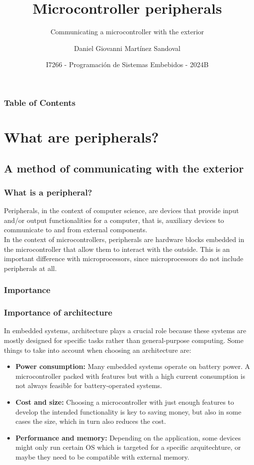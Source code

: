 \documentclass[aspectratio=169]{beamer}
\title[Microcontroller peripherals] %
{Microcontroller peripherals}
\subtitle{Communicating a microcontroller with the exterior}
\author{Daniel Giovanni Martínez Sandoval}
\institute[CUCEI - UDG]
{
  \textsc{
    \textbf{Universidad de Guadalajara}\\
    {\tiny Centro Universitario de Ciencias Exactas e Ingenierías}
  }
}
\date[October 2024] %
{\footnotesize I7266 - Programación de Sistemas Embebidos - 2024B }
\begin{document}
\frame{\titlepage}

\begin{frame}
\frametitle{Table of Contents}
\tableofcontents
\end{frame}


\section{What are peripherals?}
\subsection{A method of communicating with the exterior}
\begin{frame}
  \frametitle{What is a peripheral?}
  Peripherals, in the context of computer science, are devices that provide input and/or output functionalities for a computer, that is, auxiliary devices to communicate to and from external components. \\
  In the context of microcontrollers, peripherals are hardware blocks embedded in the microcontroller that allow them to interact with the outside. This is an important difference with microprocessors, since microprocessors do not include peripherals at all.
  \end{frame}

\subsubsection{Importance}
\begin{frame}
  \frametitle{Importance of architecture}
  In embedded systems, architecture plays a crucial role because these systems are mostly designed for specific tasks rather than general-purpose computing. Some things to take into account when choosing an architecture are:\pause
  \begin{itemize}
    \item <2-> \textbf{Power consumption:} Many embedded systems operate on battery power. A microcontroller packed with features but with a high current consumption is not always feasible for battery-operated systems. 
    \item <3-> \textbf{Cost and size:} Choosing a microcontroller with just enough features to develop the intended functionality is key to saving money, but also in some cases the size, which in turn also reduces the cost.
    \item <4-> \textbf{Performance and memory:} Depending on the application, some devices might only run certain OS which is targeted for a specific arquitechture, or maybe they need to be compatible with external memory. 
  \end{itemize}
\end{frame}
\end{document}

